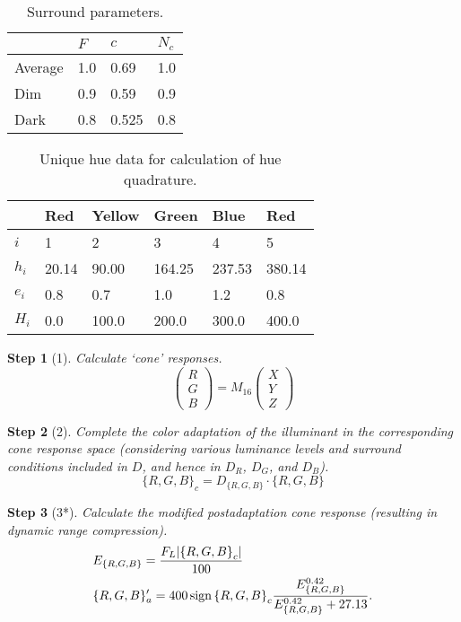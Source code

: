 \documentclass[twocolumn]{scrartcl}
\theoremstyle{named}
\newtheorem*{step}{Step}
\DeclarePairedDelimiter\abs{\lvert}{\rvert}%
\DeclareMathOperator{\sign}{sign}
\begin{document}
\begin{table}\centering
  \begin{tabularx}{\linewidth}{XXXX}
  \toprule
          & $F$ & $c$   & $N_c$\\
  \midrule
  Average & 1.0 & 0.69  & 1.0\\
  Dim     & 0.9 & 0.59  & 0.9\\
  Dark    & 0.8 & 0.525 & 0.8\\
  \bottomrule
\end{tabularx}
\caption{Surround parameters.}
\end{table}


\begin{table}\centering
  \begin{tabularx}{\linewidth}{XXXXXX}
  \toprule
        & Red   & Yellow & Green & Blue   & Red\\
  \midrule
  $i$   & 1     & 2     & 3      & 4      & 5\\
  $h_i$ & 20.14 & 90.00 & 164.25 & 237.53 & 380.14\\
  $e_i$ & 0.8   & 0.7   & 1.0    & 1.2    & 0.8\\
  $H_i$ & 0.0   & 100.0 & 200.0  & 300.0  & 400.0\\
  \bottomrule
\end{tabularx}
  \caption{Unique hue data for calculation of hue quadrature.}\label{table:hue}
\end{table}

\begin{step}[1]
Calculate `cone' responses.
\[
\begin{pmatrix}R\\G\\B\end{pmatrix}
= M_{16} \begin{pmatrix}X\\Y\\Z\end{pmatrix}
\]
\end{step}

\begin{step}[2]
Complete the color adaptation of the illuminant in
the corresponding cone response space (considering various
luminance levels and surround conditions included in $D$, and
hence in $D_R$, $D_G$, and $D_B$).
\[
  {\{R, G, B\}}_c = D_{\{R,G,B\}} \cdot \{R, G, B\}
\]
\end{step}

\begin{step}[3*]
Calculate the modified postadaptation cone response
(resulting in dynamic range compression).
\begin{align*}
  &E_{\{R,G,B\}} = \frac{F_L \abs{{\{R,G,B\}}_c}}{100}\\
  &\{R,G,B\}'_a = 400 \sign{{\{R,G,B\}}_c}
    \frac
    {E_{\{R,G,B\}}^{0.42}}
    {E_{\{R,G,B\}}^{0.42} + 27.13}.
\end{align*}
\end{step}
\end{document}
